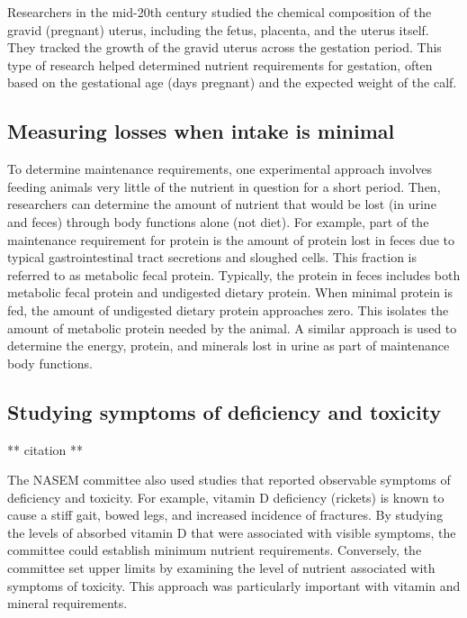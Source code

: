 \documentclass[
]{book}
\begin{document}
Researchers in the mid-20th century studied the chemical composition of the gravid (pregnant) uterus, including the fetus, placenta, and the uterus itself. They tracked the growth of the gravid uterus across the gestation period. This type of research helped determined nutrient requirements for gestation, often based on the gestational age (days pregnant) and the expected weight of the calf.

\hypertarget{measuring-losses-when-intake-is-minimal}{%
\subsection{Measuring losses when intake is minimal}\label{measuring-losses-when-intake-is-minimal}}

\citet{Swanson1977}

To determine maintenance requirements, one experimental approach involves feeding animals very little of the nutrient in question for a short period. Then, researchers can determine the amount of nutrient that would be lost (in urine and feces) through body functions alone (not diet). For example, part of the maintenance requirement for protein is the amount of protein lost in feces due to typical gastrointestinal tract secretions and sloughed cells. This fraction is referred to as metabolic fecal protein. Typically, the protein in feces includes both metabolic fecal protein and undigested dietary protein. When minimal protein is fed, the amount of undigested dietary protein approaches zero. This isolates the amount of metabolic protein needed by the animal. A similar approach is used to determine the energy, protein, and minerals lost in urine as part of maintenance body functions.

\hypertarget{studying-symptoms-of-deficiency-and-toxicity}{%
\subsection{Studying symptoms of deficiency and toxicity}\label{studying-symptoms-of-deficiency-and-toxicity}}

** citation **

The NASEM \citeyearpar{NASEM8} committee also used studies that reported observable symptoms of deficiency and toxicity. For example, vitamin D deficiency (rickets) is known to cause a stiff gait, bowed legs, and increased incidence of fractures. By studying the levels of absorbed vitamin D that were associated with visible symptoms, the committee could establish minimum nutrient requirements. Conversely, the committee set upper limits by examining the level of nutrient associated with symptoms of toxicity. This approach was particularly important with vitamin and mineral requirements.
\end{document}
